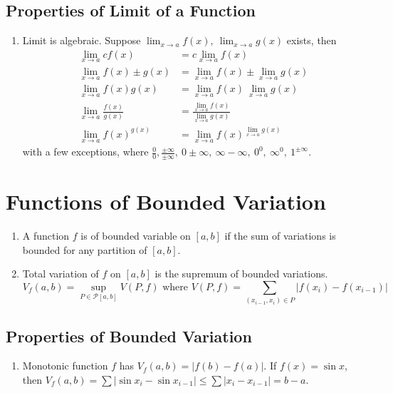 \subsection{Properties of Limit of a Function}
\begin{enumerate}
	\item Limit is algebraic.
		Suppose $\displaystyle \lim_{x \to a} f(x),\ \lim_{x \to a} g(x)$ exists, then
	\begin{align}
		\lim_{x \to a} cf(x) & = c\lim_{x \to a} f(x) \\
		\lim_{x \to a} f(x) \pm g(x)  & = \lim_{x \to a} f(x) \pm \lim_{x \to a}g(x) \\
		\lim_{x \to a} f(x)g(x) & = \lim_{x \to a}f(x) \ \lim_{x \to a}g(x) \\
		\lim_{x \to a} \frac{f(x)}{g(x)} & = \frac{\displaystyle \lim_{x \to a}f(x)}{\displaystyle \lim_{x \to a}g(x)} \\
		\lim_{x \to a} f(x)^{g(x)} & = \lim_{x \to a}f(x)^{\displaystyle \lim_{x \to a}g(x)}
	\end{align}
		with a few exceptions, where $ \frac{0}{0}, \frac{\pm \infty}{\pm \infty},\ 0 \pm \infty,\ \infty - \infty,\ 0^0,\ \infty^0,\ 1^{\pm\infty} $.
\end{enumerate}

\section{Functions of Bounded Variation}
\begin{enumerate}
	\item A function $f$ is of bounded variable on $[a,b]$ if the sum of variations is bounded for any partition of $[a,b]$.
	\item Total variation of $f$ on $[a,b]$ is the supremum of bounded variations.
		$$ V_f(a,b) = \sup_{P \in \mathscr{P}[a,b]} \!\!\! V(P,f) \text{ where } V(P,f) = \!\!\!\!\!\! \sum_{(x_{i-1},x_i) \in P}\!\!\!\!\!\! |f(x_i) - f(x_{i-1})| $$
\end{enumerate}

\subsection{Properties of Bounded Variation}
\begin{enumerate}
	\item Monotonic function $f$ has $V_f(a,b) = |f(b)-f(a)|$.
		\subitem If $f(x) = \sin x$, then $V_f(a,b) = \sum |\sin x_i - \sin x_{i-1}| \le \sum |x_i - x_{i-1}| = b-a$.
\end{enumerate}

